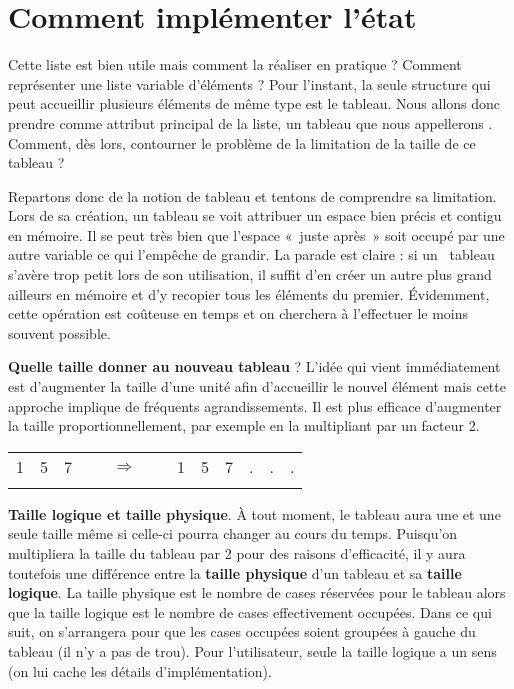 \clearpage
\section{Comment implémenter l’état}

Cette liste est bien utile mais comment la réaliser en pratique ?
Comment représenter une liste variable d’éléments ? Pour
l'instant, la seule structure qui peut accueillir
plusieurs éléments de même type est le tableau. Nous allons donc
prendre comme attribut principal de la liste, un tableau que nous
appellerons . Comment, dès lors, contourner
le problème de la limitation de la taille de ce tableau ?

Repartons donc de la notion de tableau et tentons de comprendre sa
limitation. Lors de sa création, un tableau se voit attribuer un espace
bien précis et contigu en mémoire. Il se peut très bien que
l'espace «~juste après~» soit occupé par une autre
variable ce qui l'empêche de grandir. La parade est
claire : si un \ tableau s’avère trop petit lors de son utilisation, il
suffit d’en créer un autre plus grand ailleurs en mémoire et d’y
recopier tous les éléments du premier. Évidemment, cette opération est
coûteuse en temps et on cherchera à l’effectuer le moins souvent
possible.

\textbf{Quelle taille donner au nouveau tableau} ? L’idée qui vient
immédiatement est d’augmenter la taille d’une unité afin d’accueillir
le nouvel élément mais cette approche implique de fréquents
agrandissements. Il est plus efficace d’augmenter la taille
proportionnellement, par exemple en la multipliant par un facteur 2.

\begin{center}
\begin{tabular}{|m{0.259cm}|m{0.259cm}|m{0.259cm}|m{0.087999985cm}m{0.46000004cm}m{0.087999985cm}|m{0.25300002cm}|m{0.259cm}|m{0.259cm}|m{0.15299998cm}|m{0.15299998cm}|m{0.17cm}|}
\hhline{---~~~------}
 1 &
 5 &
 7 &
~
 &
 ${\Rightarrow}$ &
~
 &
 1 &
 5 &
 7 &
 . &
 . &
 .\\\hhline{---~~~------}
\end{tabular}
\end{center}


\textbf{Taille logique et taille physique}. À tout moment, le tableau
aura une et une seule taille même si celle-ci pourra changer au cours
du temps. Puisqu’on multipliera la taille du tableau par 2 pour des
raisons d’efficacité, il y aura toutefois une différence entre la
\textbf{taille physique} d’un tableau et sa \textbf{taille logique}. La
taille physique est le nombre de cases réservées pour le tableau alors
que la taille logique est le nombre de cases effectivement occupées.
Dans ce qui suit, on s'arrangera pour que les cases
occupées soient groupées à gauche du tableau (il n'y a
pas de trou). Pour l’utilisateur, seule la taille logique a un sens (on
lui cache les détails d’implémentation).

